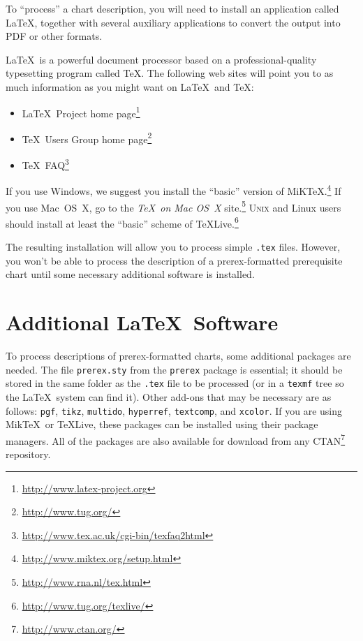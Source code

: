 \documentclass[11pt]{article}
\def\LaTeX{\mbox{LaTeX}}
\def\TeX{TeX}
\def\MikTeX{\mbox{MikTeX}}
\newcommand{\myurl}[1]{\textcolor{blue}{\underline{\textcolor{black}{\url{#1}}}}}
\begin{document}
To ``process''  a chart description, you will need to install an application
called \LaTeX, together with several auxiliary applications to convert the
output into PDF or other formats.


\LaTeX\ is a powerful document processor based on a professional-quality typesetting program called \TeX.  The following web sites 
will point you to as much information as you might want on \LaTeX\ and \TeX:
\begin{itemize}
\item \LaTeX\ Project home page\footnote{\myurl{http://www.latex-project.org}}
\item \TeX\ Users Group home page\footnote{\myurl{http://www.tug.org/}}  
\item \TeX\ FAQ\footnote{\myurl{http://www.tex.ac.uk/cgi-bin/texfaq2html}}
\end{itemize}

If you use Windows,  
we suggest you install the ``basic'' version of 
MiKTeX.\footnote{%
\myurl{http://www.miktex.org/setup.html}}
If you use Mac~OS~X, go to
the \emph{\TeX\ on Mac OS~X} site.\footnote{%
\myurl{http://www.rna.nl/tex.html}}
\textsc{Unix} and Linux users should install at least the ``basic'' scheme of TeXLive.\footnote{%
\myurl{http://www.tug.org/texlive/}}

The resulting installation will allow you to process simple \texttt{.tex} files. 
However, you won't be able
to process the description of a prerex-formatted prerequisite chart until 
some necessary additional software is installed.

\section{Additional \LaTeX\  Software}
\label{additional}

To process descriptions of prerex-formatted charts,  some additional packages
are needed. 
The file \texttt{prerex.sty} from the \texttt{prerex} package is essential;
it should be stored
in the same folder as the \texttt{.tex} file to be processed
(or in 
a \verb|texmf| tree so the \LaTeX\ system can find it).
Other add-ons that may be necessary are as follows: 
\texttt{pgf}, 
\texttt{tikz}, 
\texttt{multido}, 
\texttt{hyperref},
\texttt{textcomp}, and
\texttt{xcolor}.
If you are using \MikTeX\ or TeXLive, these packages can be installed using their 
package managers.
All of the packages are also available
for download from any CTAN\footnote{%
\myurl{http://www.ctan.org/}} repository.
\end{document}
